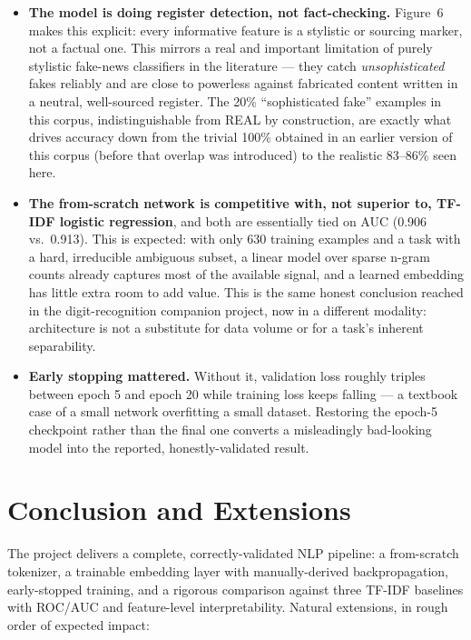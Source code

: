 \documentclass[12pt]{article}
\begin{document}
\begin{itemize}[leftmargin=1.4em]
\item \textbf{The model is doing register detection, not fact-checking.} Figure~6 makes this explicit: every informative feature is a stylistic or sourcing marker, not a factual one. This mirrors a real and important limitation of purely stylistic fake-news classifiers in the literature --- they catch \emph{unsophisticated} fakes reliably and are close to powerless against fabricated content written in a neutral, well-sourced register. The 20\% ``sophisticated fake'' examples in this corpus, indistinguishable from REAL by construction, are exactly what drives accuracy down from the trivial 100\% obtained in an earlier version of this corpus (before that overlap was introduced) to the realistic 83--86\% seen here.
\item \textbf{The from-scratch network is competitive with, not superior to, TF-IDF logistic regression}, and both are essentially tied on AUC (0.906 vs.\ 0.913). This is expected: with only 630 training examples and a task with a hard, irreducible ambiguous subset, a linear model over sparse n-gram counts already captures most of the available signal, and a learned embedding has little extra room to add value. This is the same honest conclusion reached in the digit-recognition companion project, now in a different modality: architecture is not a substitute for data volume or for a task's inherent separability.
\item \textbf{Early stopping mattered.} Without it, validation loss roughly triples between epoch 5 and epoch 20 while training loss keeps falling --- a textbook case of a small network overfitting a small dataset. Restoring the epoch-5 checkpoint rather than the final one converts a misleadingly bad-looking model into the reported, honestly-validated result.
\end{itemize}

\section{Conclusion and Extensions}
The project delivers a complete, correctly-validated NLP pipeline: a from-scratch tokenizer, a trainable embedding layer with manually-derived backpropagation, early-stopped training, and a rigorous comparison against three TF-IDF baselines with ROC/AUC and feature-level interpretability. Natural extensions, in rough order of expected impact:
\end{document}
